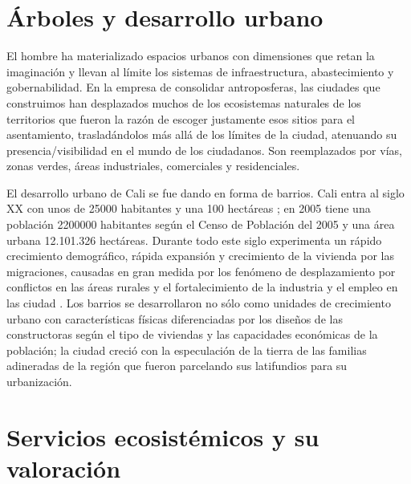 \documentclass[12pt,]{book}
\begin{document}
\section{Árboles y desarrollo urbano}\label{arboles-y-desarrollo-urbano}

El hombre ha materializado espacios urbanos con dimensiones que retan la
imaginación y llevan al límite los sistemas de infraestructura,
abastecimiento y gobernabilidad. En la empresa de consolidar
antroposferas, las ciudades que construimos han desplazados muchos de
los ecosistemas naturales de los territorios que fueron la razón de
escoger justamente esos sitios para el asentamiento, trasladándolos más
allá de los límites de la ciudad, atenuando su presencia/visibilidad en
el mundo de los ciudadanos. Son reemplazados por vías, zonas verdes,
áreas industriales, comerciales y
residenciales\citep{azocar_urbanization_2007}.

El desarrollo urbano de Cali se fue dando en forma de barrios. Cali
entra al siglo XX con unos de 25000 habitantes y una 100 hectáreas
\citep{vasquez_historia_1990}; en 2005 tiene una población 2200000
habitantes según el Censo de Población del 2005 y una área urbana
12.101.326 hectáreas. Durante todo este siglo experimenta un rápido
crecimiento demográfico, rápida expansión y crecimiento de la vivienda
por las migraciones, causadas en gran medida por los fenómeno de
desplazamiento por conflictos en las áreas rurales y el fortalecimiento
de la industria y el empleo en las ciudad \citep{vasquez_historia_1990}.
Los barrios se desarrollaron no sólo como unidades de crecimiento urbano
con características físicas diferenciadas por los diseños de las
constructoras según el tipo de viviendas y las capacidades económicas de
la población; la ciudad creció con la especulación de la tierra de las
familias adineradas de la región que fueron parcelando sus latifundios
para su urbanización.

\section{Servicios ecosistémicos y su
valoración}\label{servicios-ecosistemicos-y-su-valoracion}
\end{document}
